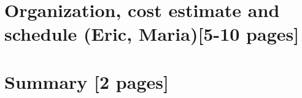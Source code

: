 \ifdefined\isfinal\documentclass[final]{pd-tdr}\else\documentclass{pd-tdr}\fi
\begin{document}
\chapter{Organization, cost estimate and schedule {\color{red} (Eric, Maria)[5-10 pages]}}
%


%
% 


\newpage
\chapter{Summary {\color{red}[2 pages]}}
%



% 

\cleardoublepage


\end{document}
